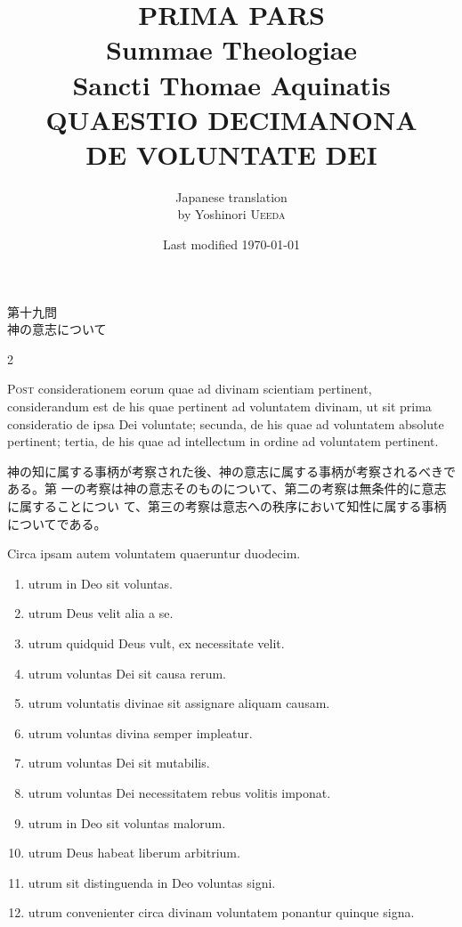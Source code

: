 \documentclass[paper=a4paper,fontsize=10pt,jafontsize=9pt,titlepage]{jlreq}
\title{{\bfseries PRIMA PARS}\\{\Huge Summae Theologiae}\\Sancti Thomae
Aquinatis\\{\sffamily QUAESTIO DECIMANONA}\\DE VOLUNTATE DEI}
\author{Japanese translation\\by Yoshinori {\scshape Ueeda}}
\date{Last modified \today}
\begin{document}
\maketitle
\pagestyle{fancy}

\begin{center}
{\Large 第十九問\\神の意志について}
\end{center}


\begin{paracol}{2}

{\huge P}{\scshape ost} considerationem eorum quae ad divinam scientiam
pertinent, considerandum est de his quae pertinent ad voluntatem divinam, ut sit
prima consideratio de ipsa Dei voluntate; secunda, de his quae ad voluntatem
absolute pertinent; tertia, de his quae ad intellectum in ordine ad voluntatem
pertinent.

\switchcolumn

神の知に属する事柄が考察された後、神の意志に属する事柄が考察されるべきである。第
一の考察は神の意志そのものについて、第二の考察は無条件的に意志に属することについ
て、第三の考察は意志への秩序において知性に属する事柄についてである。

\switchcolumn


Circa ipsam autem voluntatem quaeruntur duodecim. 

\begin{enumerate}
 \item utrum in Deo sit voluntas.
 \item utrum Deus velit alia a se.
 \item utrum quidquid Deus vult, ex necessitate velit.
 \item utrum voluntas Dei sit causa rerum.
 \item utrum voluntatis divinae sit assignare aliquam causam.
 \item utrum voluntas divina semper impleatur.
 \item utrum voluntas Dei sit mutabilis.
 \item utrum voluntas Dei necessitatem rebus volitis imponat.
 \item utrum in Deo sit voluntas malorum.
 \item utrum Deus habeat liberum arbitrium.
 \item utrum sit distinguenda in Deo voluntas signi.
 \item utrum convenienter circa divinam voluntatem ponantur quinque signa.
\end{enumerate}


\end{paracol}
\end{document}

